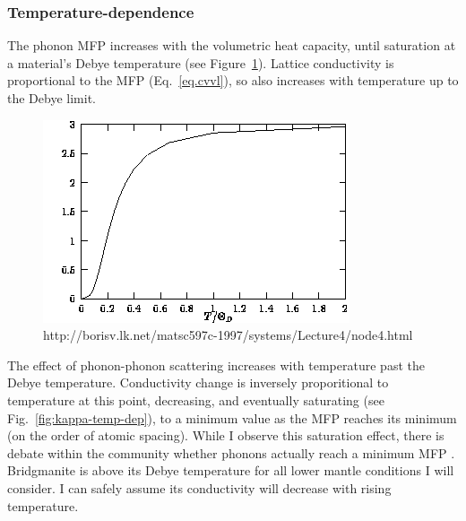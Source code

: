 \subsubsection{Temperature-dependence}

The phonon MFP increases with the volumetric heat capacity, until saturation at a material's Debye temperature (see Figure~\ref{fig:debye-model}). Lattice conductivity is proportional to the MFP (Eq.~\ref{eq.cvvl}), so also increases with temperature up to the Debye limit. 

\begin{figure}[h!]
  \includegraphics[width=\linewidth]{Figures/debye-model.png}
  \caption[DEBYE MODEL]{http://borisv.lk.net/matsc597c-1997/systems/Lecture4/node4.html}
  \label{fig:debye-model}
\end{figure}

The effect of phonon-phonon scattering increases with temperature past the Debye temperature. Conductivity change is inversely proporitional to temperature at this point, decreasing, and eventually saturating (see Fig.~\ref{fig:kappa-temp-dep}), to a minimum value as the MFP reaches its 
minimum (on the order of atomic spacing). While I observe this saturation effect, there is debate within the community whether phonons actually reach a minimum MFP \citep[e.g.][]{Ghaderi2017}. Bridgmanite is above its Debye temperature for all lower mantle conditions I will consider. I can safely assume its conductivity will decrease with rising temperature.

